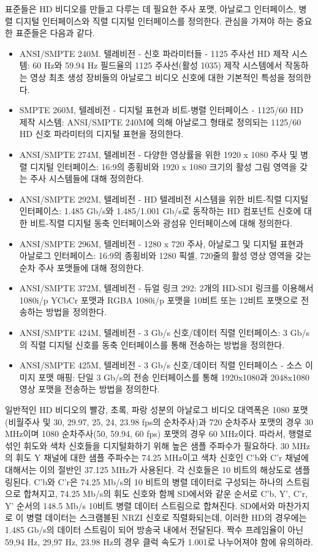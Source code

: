 표준들은 HD 비디오를 만들고 다루는 데 필요한 주사 포맷, 아날로그 인터페이스, 병렬 디지털 인터페이스와 직렬 디지털 인터페이스를 정의한다. 관심을 가져야 하는 중요한 표준들은 다음과 같다.
\begin{itemize}
    \item ANSI/SMPTE 240M. 텔레비전 - 신호 파라미터들 - 1125 주사선 HD 제작 시스템: 60 Hz와 59.94 Hz 필드율의 1125 주사선(활성 1035) 제작 시스템에서 작동하는 영상 최초 생성 장비들의 아날로그 비디오 신호에 대한 기본적인 특성을 정의한다.
    \item SMPTE 260M, 텔레비전 - 디지털 표현과 비트-병렬 인터페이스 - 1125/60 HD 제작 시스템: ANSI/SMPTE 240M에 의해 아날로그 형태로 정의되는 1125/60 HD 신호 파라미터의 디지털 표현을 정의한다.
    \item ANSI/SMPTE 274M, 텔레비전 - 다양한 영상률을 위한 1920 x 1080 주사 및 병렬 디지털 인터페이스: 16:9의 종횡비와 1920 x 1080 크기의 활성 그림 영역을 갖는 주사 시스템들에 대해 정의한다.
    \item ANSI/SMPTE 292M, 텔레비전 - HD 텔레비전 시스템을 위한 비트-직렬 디지털 인터페이스: 1.485 Gb/s와 1.485/1.001 Gb/s로 동작하는 HD 컴포넌트 신호에 대한 비트-직렬 디지털 동축 인터페이스와 광섬유 인터페이스에 대해 정의한다.
    \item ANSI/SMPTE 296M, 텔레비전 - 1280 x 720 주사, 아날로그 및 디지털 표현과 아날로그 인터페이스: 16:9의 종횡비와 1280 픽셀, 720줄의 활성 영상 영역을 갖는 순차 주사 포맷들에 대해 정의한다.
    \item ANSI/SMPTE 372M, 텔레비전 - 듀얼 링크 292: 2개의 HD-SDI 링크를 이용해서 1080i/p YCbCr 포맷과 RGBA 1080i/p 포맷을 10비트 또는 12비트 포맷으로 전송하는 방법을 정의한다.
    \item ANSI/SMPTE 424M, 텔레비전 - 3 Gb/s 신호/데이터 직렬 인터페이스: 3 Gb/s의 직렬 디지털 신호를 동축 인터페이스를 통해 전송하는 방법을 정의한다.
    \item ANSI/SMPTE 425M, 텔레비전 - 3 Gb/s 신호/데이터 직렬 인터페이스 - 소스 이미지 포맷 매핑: 단일 3 Gb/s의 전송 인터페이스를 통해 1920x1080과 2048x1080 영상 포맷을 전송하는 방법을 정의한다.
\end{itemize}



일반적인 HD 비디오의 빨강, 초록, 파랑 성분의 아날로그 비디오 대역폭은 1080 포맷(비월주사 및  30, 29.97, 25, 24, 23.98 fps의 순차주사)과 720 순차주사 포맷의 경우 30 MHz이며 1080 순차주사(50, 59.94, 60 fps) 포맷의 경우 60 MHz이다.
따라서, 행렬로 섞인 휘도와 색차 신호들을 디지털화하기 위해 높은 샘플 주파수가 필요하다. 30 MHz의 휘도 Y 채널에 대한 샘플 주파수는 74.25 MHz이고 색차 신호인 C'b와 C'r 채널에 대해서는 이의 절반인 37.125 MHz가 사용된다.
각 신호들은 10 비트의 해상도로 샘플링된다. C'b와 C'r은 74.25 Mb/s의 10 비트의 병렬 데이터로 구성되는 하나의 스트림으로 합쳐지고, 74.25 Mb/s의 휘도 신호와 함께 SD에서와 같운 순서로 C'b, Y', C'r, Y' 순서의 148.5 Mb/s 10비트 병렬 데이터 스트림으로 합쳐진다.
SD에서와 마찬가지로 이 병렬 데이터는 스크램블된 NRZI 신호로 직렬화되는데, 이러한 HD의 경우에는 1.485 Gb/s의 데이터 스트림이 되어 방송국 내에서 전달된다. 짝수 프레임율이 아닌 59,94 Hz, 29,97 Hz, 23.98 Hz의 경우 클럭 속도가 1.001로 나누어져야 함에 유의하라.
